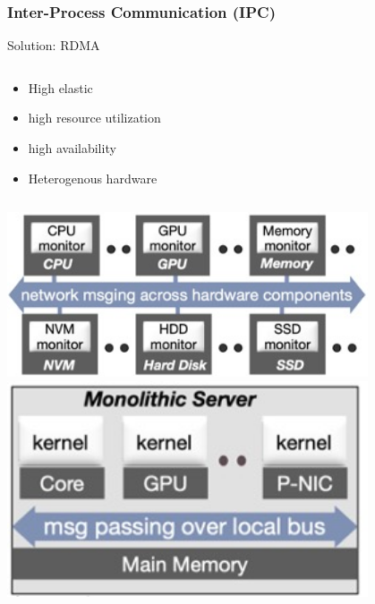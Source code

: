 \begin{frame}
\frametitle{Inter-Process Communication (IPC)}
\begin{block}{Solution: RDMA}
\begin{column}{.5\textwidth}
\begin{itemize}
	\item High elastic 
	\item high resource utilization
	\item high availability 
	\item Heterogenous hardware
\end{itemize} 
\end{column}
\begin{column}{.5\textwidth}
\includegraphics[width=0.8\textwidth]{fig23/rdma3.jpg}
\includegraphics[width=0.8\textwidth]{fig23/rdma4.jpg}
\end{column}
\end{block}
\end{frame}



